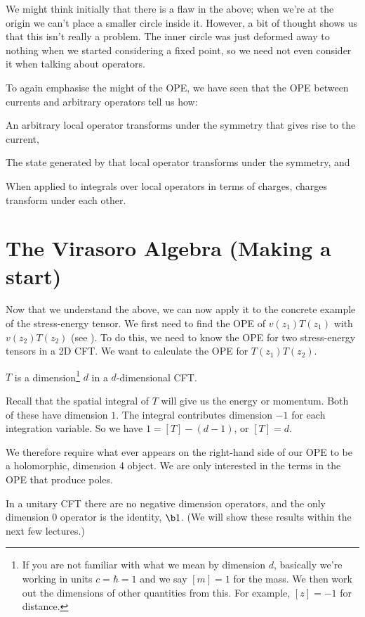 \br 
We might think initially that there is a flaw in the above; when we're at the origin we can't place a smaller circle inside it. However, a bit of thought shows us that this isn't really a problem. The inner circle was just deformed away to nothing when we started considering a fixed point, so we need not even consider it when talking about operators. 
\er 

\br 
To again emphasise the might of the OPE, we have seen that the OPE between currents and arbitrary operators tell us how:
\ben
    \item An arbitrary local operator transforms under the symmetry that gives rise to the current, 
    \item The state generated by that local operator transforms under the symmetry, and
    \item When applied to integrals over local operators in terms of charges, charges transform under each other. 
\een
\er 

\section{The Virasoro Algebra (Making a start)}

Now that we understand the above, we can now apply it to the concrete example of the stress-energy tensor. We first need to find the OPE of $v(z_1)T(z_1)$ with $v(z_2)T(z_2)$ (see ). To do this, we need to know the OPE for two stress-energy tensors in a 2D CFT. We want to calculate the OPE for $T(z_1)T(z_2)$. 

\bp 
$T$ is a dimension\footnote{If you are not familiar with what we mean by dimension $d$, basically we're working in units $c=\hbar=1$ and we say $[m]=1$ for the mass. We then work out the dimensions of other quantities from this. For example, $[z]=-1$ for distance.} $d$ in a $d$-dimensional CFT.
\ep 

\bq
Recall that the spatial integral of $T$ will give us the energy or momentum. Both of these have dimension $1$. The integral contributes dimension $-1$ for each integration variable. So we have $1=[T]-(d-1)$, or $[T]=d$. 
\eq

We therefore require what ever appears on the right-hand side of our OPE to be a holomorphic, dimension 4 object. We are only interested in the terms in the OPE that produce poles. 

\bcl 
In a unitary CFT there are no negative dimension operators, and the only dimension 0 operator is the identity, $\b1$. (We will show these results within the next few lectures.)
\ecl 

